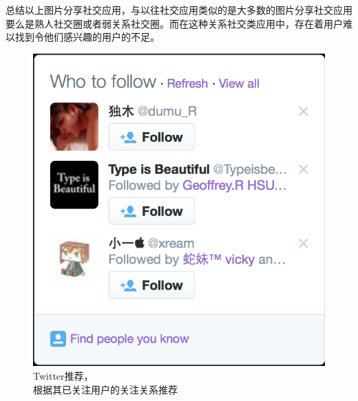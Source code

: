 总结以上图片分享社交应用，与以往社交应用类似的是大多数的图片分享社交应用要么是熟人社交圈或者弱关系社交圈。而在这种关系社交类应用中，存在着用户难以找到令他们感兴趣的用户的不足。

\begin{figure}[h] 
\begin{minipage}[t]{0.45\linewidth}
\centering
\includegraphics[width=\textwidth]{img/chap1/twitter_recommend.png}
\caption{Twitter推荐，\\根据其已关注用户的关注关系推荐\label{Twitter推荐，根据其已关注用户的关注关系推荐}}
\end{minipage}
\hfill
\begin{minipage}[t]{0.45\linewidth}
\centering

\end{minipage}
\end{figure}
